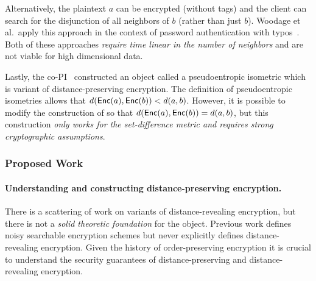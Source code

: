 \iffalse
The approach can be summarized as follows:
\begin{enumerate}\setlength\itemsep{0em}
\item The clients appends to $\enc(a)$ a deterministic encryption of all $b$ such that $d(a,b) \le 1$.
\item To search, the client deterministically encrypts their search term $b$.
\item The server returns all ciphertexts where some encryption matches.\footnote{Some  modifications are necessary to meet ideal security such as hiding the number of neighbors.  See the prior work of Boldyreva and Chenette~\cite{boldyreva2014efficient}.}  
\end{enumerate}
\fi

Alternatively, the plaintext $a$ can be encrypted (without tags) and the client can search for the disjunction of all neighbors of $b$ (rather than just $b$).  Woodage et al.~apply this approach in the context of password authentication with typos~\cite{C:WCDJR17}.  Both of these approaches {\em require time linear in the number of neighbors} and are not viable for high dimensional data.

Lastly, the co-PI~\cite{EPRINT:ABCFG16} constructed an object called a pseudoentropic isometric which is variant of distance-preserving encryption.  The definition of pseudoentropic isometries allows that $d(\mathsf{Enc}(a), \mathsf{Enc}(b)) <d(a,b)$.  However, it is possible to modify the construction of \cite{EPRINT:ABCFG16} so that $d(\mathsf{Enc}(a), \mathsf{Enc}(b)) = d(a,b)$, but this construction {\em only works for the set-difference metric and requires strong cryptographic assumptions}.

\subsubsection{Proposed Work}

\paragraph{Understanding and constructing distance-preserving encryption.}
There is a scattering of work on variants of distance-revealing
encryption, but there is not a {\em solid theoretic foundation} for the
object.  Previous work defines noisy searchable encryption schemes but
never explicitly defines distance-revealing encryption.   Given the history of order-preserving encryption it is crucial to understand the security guarantees of distance-preserving and distance-revealing encryption. %

